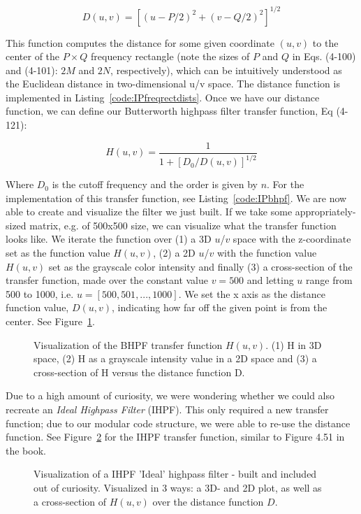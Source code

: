 \documentclass{article}
\begin{document}
\[
D(u,v)=[(u-P/2)^2+(v-Q/2)^2]^{1/2}
\]

This function computes the distance for some given coordinate $(u, v)$ to the center of the $P \times Q$ frequency rectangle (note the sizes of $P$ and $Q$ in Eqs. (4-100) and (4-101): $2M$ and $2N$, respectively), which can be intuitively understood as the Euclidean distance in two-dimensional u/v space. The distance function is implemented in  Listing~\ref{code:IPfreqrectdists}. Once we have our distance function, we can define our Butterworth highpass filter transfer function, Eq (4-121):

\[
H(u, v) = \frac{1}{1+[D_0 / D(u, v)]^{1/2}}
\]

Where $D_0$ is the cutoff frequency and the order is given by $n$. For the implementation of this transfer function, see  Listing~\ref{code:IPbhpf}. We are now able to create and visualize the filter we just built. If we take some appropriately-sized matrix, e.g. of 500x500 size, we can visualize what the transfer function looks like. We iterate the function over (1) a 3D $u$/$v$ space with the z-coordinate set as the function value $H(u, v)$, (2) a 2D $u$/$v$ with the function value $H(u, v)$ set as the grayscale color intensity and finally (3) a cross-section of the transfer function, made over the constant value $v = 500$ and letting $u$ range from 500 to 1000, i.e. $u = [500, 501, ..., 1000]$. We set the x axis as the distance function value, $D(u, v)$, indicating how far off the given point is from the center. See Figure~\ref{fig:bhpf}.

\begin{figure}[ht]
    \centering
    
    \caption{Visualization of the BHPF transfer function $H(u, v)$. (1) H in 3D space, (2) H as a grayscale intensity value in a 2D space and (3) a cross-section of H versus the distance function D.}
    \label{fig:bhpf}
\end{figure}

Due to a high amount of curiosity, we were wondering whether we could also recreate an \textit{Ideal Highpass Filter} (IHPF). This only required a new transfer function; due to our modular code structure, we were able to re-use the distance function. See Figure~\ref{fig:ihpf} for the IHPF transfer function, similar to Figure 4.51 in the book.

\begin{figure}[ht]
    \centering
    
    \caption{Visualization of a IHPF 'Ideal' highpass filter - built and included out of curiosity. Visualized in 3 ways: a 3D- and 2D plot, as well as a cross-section of $H(u, v)$ over the distance function $D$.}
    \label{fig:ihpf}
\end{figure}
\end{document}
